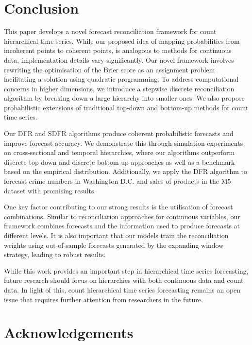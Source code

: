 \documentclass[a4paper,review,11pt,authoryear]{elsarticle}
\theoremstyle{definition}
\begin{document}
     \section{Conclusion}
     \label{sec:conclusion}

     This paper develops a novel forecast reconciliation framework for count hierarchical time series.
     While our proposed idea of mapping probabilities from incoherent points to coherent points, is analogous to methods for continuous data, implementation details vary significantly.
     Our novel framework involves rewriting the optimisation of the Brier score as an assignment problem facilitating a solution using quadratic programming. 
     To address computational concerns in higher dimensions, we introduce a stepwise discrete reconciliation algorithm by breaking down a large hierarchy into smaller ones.
     We also propose probabilistic extensions of traditional top-down and bottom-up methods for count time series.

     Our DFR and SDFR algorithms produce coherent probabilistic forecasts and improve forecast accuracy.
     We demonstrate this through simulation experiments on cross-sectional and temporal hierarchies, where our algorithms outperform discrete top-down and discrete bottom-up approaches as well as a benchmark based on the empirical distribution. Additionally, we apply the DFR algorithm to forecast crime numbers in Washington D.C. and sales of products in the M5 dataset with promising results.
     
     One key factor contributing to our strong results is the utilisation of forecast combinations.
     Similar to reconciliation approaches for continuous variables, our framework combines forecasts and the information used to produce forecasts at different levels.
     It is also important that our models train the reconciliation weights using out-of-sample forecasts generated by the expanding window strategy, leading to robust results.


     While this work provides an important step in hierarchical time series forecasting, future research should focus on hierarchies with both continuous data and count data. In light of this, count hierarchical time series forecasting remains an open issue that requires further attention from researchers in the future.

\section*{Acknowledgements}
\end{document}
